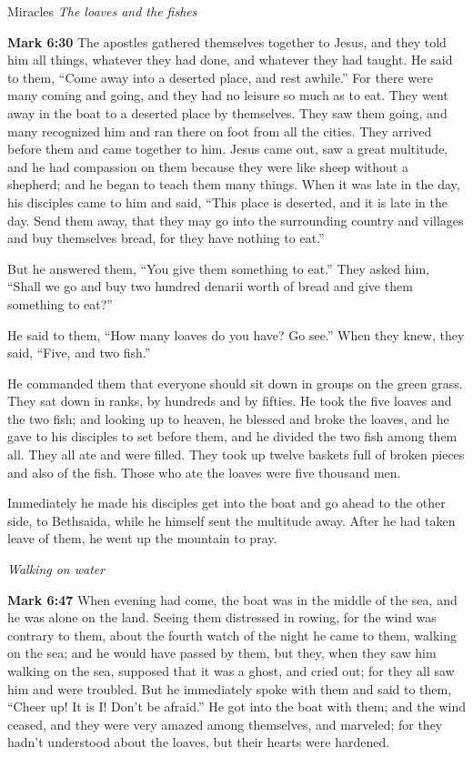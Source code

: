 \documentclass[10pt,twoside]{article} %
\newcommand{\quotesize}{\normalsize{}}
\newenvironment{quotetext}{\begingroup\quotesize}{\endgroup}
\newcommand{\bible}[2]{\begin{quotetext}\textbf{#1} #2\end{quotetext}}
\newcommand{\gospelmark}[2]{\bible{Mark #1}{#2}}
\newcommand{\subhead}[1]{\emph{#1}\par}
\DeclareRobustCommand{\stixdangerousbend}{%
  {\usefont{U}{stixbbit}{m}{it}\symbol{"F6}}%
}
\newcommand{\dangerousbend}{\rotatebox[origin=c]{-10}{\stixdangerousbend}}
\newcommand{\link}[2]{\protect\jumplink{anchor-#1}{\textcolor{blue}{#2}}} %
\newcommand{\notewithoutbackref}[1]{\link{note-#1}{\dangerousbend\pageref{note:#1}}}
\begin{document}
\begin{section}{Miracles}
\subhead{The loaves and the fishes}

\gospelmark{6:30}{
The apostles gathered themselves together to Jesus, and they told him all things, whatever they had done, and whatever they had taught.   He said to them, ``Come away into a deserted place, and rest awhile.'' For there were many coming and going, and they had no leisure so much as to eat.   They went away in the boat to a deserted place by themselves.   They saw them going, and many recognized him and ran there on foot from all the cities. They arrived before them and came together to him.   Jesus came out, saw a great multitude, and he had compassion on them because they were like sheep without a shepherd; and he began to teach them many things.   When it was late in the day, his disciples came to him and said, ``This place is deserted, and it is late in the day.   Send them away, that they may go into the surrounding country and villages and buy themselves bread, for they have nothing to eat.''

  But he answered them, ``You give them something to eat.''
They asked him, ``Shall we go and buy two hundred denarii worth of bread and give them something to eat?''

  He said to them, ``How many loaves do you have? Go see.''
When they knew, they said, ``Five, and two fish.''

  He commanded them that everyone should sit down in groups on the green grass.   They sat down in ranks, by hundreds and by fifties.   He took the five loaves and the two fish; and looking up to heaven, he blessed and broke the loaves, and he gave to his disciples to set before them, and he divided the two fish among them all.   They all ate and were filled.   They took up twelve baskets full of broken pieces and also of the fish.   Those who ate the loaves were five thousand men.

  Immediately he made his disciples get into the boat and go ahead to the other side, to Bethsaida,\notewithoutbackref{bethsaida} while he himself sent the multitude away.   After he had taken leave of them, he went up the mountain to pray.
}

\subhead{Walking on water}

\gospelmark{6:47}{
  When evening had come, the boat was in the middle of the sea, and he was alone on the land.   Seeing them distressed in rowing, for the wind was contrary to them, about the fourth watch of the night he came to them, walking on the sea;  and he would have passed by them,   but they, when they saw him walking on the sea, supposed that it was a ghost, and cried out;   for they all saw him and were troubled. But he immediately spoke with them and said to them, ``Cheer up! It is I! Don't be afraid.''   He got into the boat with them; and the wind ceased, and they were very amazed among themselves, and marveled;   for they hadn't understood about the loaves, but their hearts were hardened.

}
\end{section}
\end{document}
